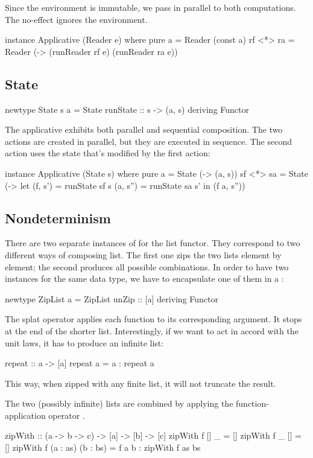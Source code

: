 \documentclass[DaoFP]{subfiles}
\begin{document}
Since the environment is immutable, we pass in parallel to both computations. The no-effect  ignores the environment.
\begin{haskell}
instance Applicative (Reader e) where
  pure a = Reader (const a)
  rf <*> ra = Reader (\e -> (runReader rf e) (runReader ra e))
\end{haskell}

\subsection{State}
\begin{haskell}
newtype State s a = State { runState :: s -> (a, s) }
  deriving Functor
\end{haskell}

The  applicative exhibits both parallel and sequential composition. The two actions are created in parallel, but they are executed in sequence. The second action uses the state that's modified by the first action:
\begin{haskell}
instance Applicative (State s) where
  pure a = State (\s -> (a, s))
  sf <*> sa = State (\s ->
    let (f, s')  = runState sf s
        (a, s'') = runState sa s' 
    in (f a, s''))
\end{haskell}

\subsection{Nondeterminism}
There are two separate instances of  for the list functor. They correspond to two different ways of composing list. The first one zips the two lists element by element; the second produces all possible combinations. In order to have two instances for the same data type, we have to encapsulate one of them in a :
\begin{haskell}
newtype ZipList a = ZipList { unZip :: [a] }
  deriving Functor
\end{haskell}
The splat operator applies each function to its corresponding argument. It stops at the end of the shorter list. Interestingly, if we want  to act in accord with the unit laws, it has to produce an infinite list:
\begin{haskell}
repeat :: a -> [a]
repeat a = a : repeat a
\end{haskell}
This way, when zipped with any finite list, it will not truncate the result.
The two (possibly infinite) lists are combined by applying the function-application operator \hask{$}.
\begin{haskell}
zipWith :: (a -> b -> c) -> [a] -> [b] -> [c]
zipWith f [] _ = []
zipWith f _ [] = []
zipWith f (a : as) (b : bs) = f a b : zipWith f as bs 
\end{haskell}
\end{document}
